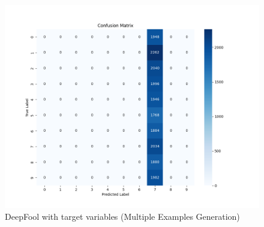 \documentclass[11pt,onside]{article}
\begin{document}
\begin{figure}[h]
\centering
\includegraphics[width=1\textwidth]{V1_images/Mul_DeepFool_with_target.png}
\caption{DeepFool with target variables (Multiple Examples Generation)}
\label{fig: DeepFool with target variables (Multiple Examples Generation)}
\end{figure}
\end{document}
